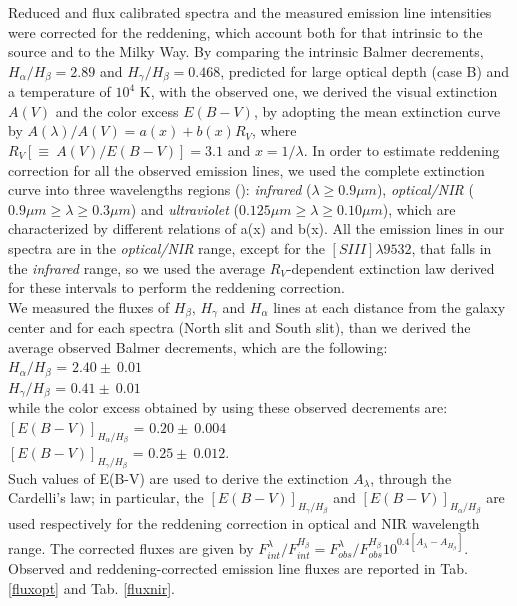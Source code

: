 \documentclass[12pt,preprint]{aastex}
\begin{document}
Reduced and flux calibrated spectra and the measured emission line
intensities were corrected for the reddening, which account both for
that intrinsic to the source and to the Milky Way. By comparing the
intrinsic Balmer decrements, $H_{\alpha}/H_{\beta}=2.89$ and
$H_{\gamma}/H_{\beta}=0.468$, predicted for large optical depth (case
B) and a temperature of $10^4$ K, with the observed one, we derived
the visual extinction $A(V)$ and the color excess $E(B-V)$, by
adopting the mean extinction curve by \citet{Card89} $A(\lambda)/A(V)
= a(x)+b(x)R_{V}$, where $R_{V}[\equiv\ A(V)/E(B-V)]=3.1$ and
$x=1/\lambda$.
In order to estimate reddening correction for all the observed
emission lines, we used the complete extinction
curve into three wavelengths regions (\citet{Card89}):
\emph{infrared} ($\lambda\geq0.9 \mu m$), \emph{optical/NIR}
($0.9\mu m\geq\lambda\geq0.3 \mu m$) and \emph{ultraviolet} ($0.125\mu
m\geq\lambda\geq0.10 \mu m$), which are characterized by different
relations of a(x) and b(x). All the emission lines in our spectra are
in the \emph{optical/NIR} range, except for the $[SIII]\lambda9532$,
that falls in the \emph{infrared} range, so we used the average
$R_{V}$-dependent extinction law derived for these intervals to
perform the reddening correction.\\ We measured the fluxes of
$H_{\beta}$, $H_{\gamma}$ and $H_{\alpha}$ lines at each distance from
the galaxy center and for each spectra (North slit and South slit),
than we derived the average observed Balmer decrements, which are the
following:\\ $H_{\alpha}/H_{\beta}$ = $2.40 \pm\ 0.01$\\
$H_{\gamma}/H_{\beta}$ = $0.41 \pm\ 0.01$\\ while the color excess
obtained by using these observed decrements are:\\
$[E(B-V)]_{H_{\alpha}/H_{\beta}}$ = $0.20 \pm\ 0.004$\\
$[E(B-V)]_{H_{\gamma}/H_{\beta}}$ = $0.25 \pm\ 0.012$.\\ Such values
of E(B-V) are used to derive the extinction $A_{\lambda}$, through the
Cardelli's law; in particular, the $[E(B-V)]_{H_{\gamma}/H_{\beta}}$
and $[E(B-V)]_{H_{\alpha}/H_{\beta}}$ are used respectively for the
reddening correction in optical and NIR wavelength range.  The
corrected fluxes are given by $F^{\lambda}_{int} / F^{H_{\beta}}_{int}
= F^{\lambda}_{obs} / F^{H_{\beta}}_{obs}
10^{0.4[A_{\lambda}-A_{H_{\beta}}]}$. Observed and reddening-corrected
emission line fluxes are reported in Tab. \ref{fluxopt} and
Tab. \ref{fluxnir}.
\end{document}
